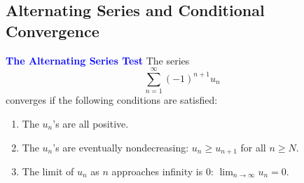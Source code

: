 \documentclass[12pt,a4paper]{article}
\newenvironment{theorem}{\begin{theorembox}}{\end{theorembox}\vspace{1\baselineskip}}
\begin{document}
\subsection*{Alternating Series and Conditional Convergence}




\begin{theorem}
    \textcolor{blue}{\textbf{The Alternating Series Test}}
    The series
    \[\sum_{n=1}^{\infty}(-1)^{n+1}u_n\]
    converges if the following conditions are satisfied:
    \begin{enumerate}
        \item The \(u_n\)'s are all positive.
        \item The \(u_n\)'s are eventually nondecreasing: \(u_n \geq u_{n+1}\) for all \(n \geq N\).
        \item The limit of \( u_n \) as \( n \) approaches infinity is \( 0 \): \( \lim_{n \to \infty} u_n = 0 \).
    \end{enumerate}

\end{theorem}


\
\end{document}
